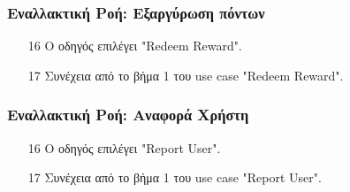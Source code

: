 \subsubsection{Εναλλακτική Ροή: Εξαργύρωση πόντων}

\begin{enumerate}
    \item[16] Ο οδηγός επιλέγει "Redeem Reward".
    \item[17] Συνέχεια από το βήμα 1 του use case "Redeem Reward".
\end{enumerate}

\subsubsection{Εναλλακτική Ροή: Αναφορά Χρήστη}

\begin{enumerate}
    \item[16] Ο οδηγός επιλέγει "Report User".
    \item[17] Συνέχεια από το βήμα 1 του use case "Report User".
\end{enumerate}

\newpage



